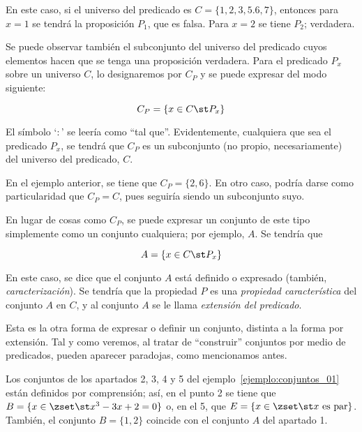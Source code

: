 
En este caso, si el universo del predicado es $C = \{1, 2, 3, 5. 6, 7\}$,
entonces para $x = 1$ se tendrá la proposición $P_1$, que es falsa. Para $x
= 2$ se tiene $P_2$; verdadera.

Se puede observar también el subconjunto del universo del predicado cuyos
elementos hacen que se tenga una proposición verdadera. Para el predicado
$P_x$ sobre un universo $C$, lo designaremos por $C_P$ y se puede expresar
del modo siguiente:

$$ C_P = \{x \in C \st P_x\} $$

\noindent El símbolo `$:$' se leería como ``tal que''. Evidentemente,
cualquiera que sea el predicado $P_x$, se tendrá que $C_P$ es un subconjunto
(no propio, necesariamente) del universo del predicado, $C$.

En el ejemplo anterior, se tiene que $C_P = \{2, 6\}$. En otro caso, podría
darse como particularidad que $C_P = C$, pues seguiría siendo un subconjunto
suyo.

En lugar de cosas como $C_P$, se puede expresar un conjunto de este tipo
simplemente como un conjunto cualquiera; por ejemplo, $A$. Se tendría que

$$ A = \{x \in C \st P_x\} $$

\noindent En este caso, se dice que el conjunto $A$ está definido o
expresado  (también,
\emph{caracterización}\footnotemark). Se tendría que la propiedad $P$ es una
\emph{propiedad característica} del conjunto $A$ en $C$, y al conjunto $A$
se le llama \emph{extensión del predicado}.


Esta es la otra forma de expresar o definir un conjunto, distinta a la forma
por extensión. Tal y como veremos, al tratar de ``construir'' conjuntos por
medio de predicados, pueden aparecer paradojas, como mencionamos antes.

Los conjuntos de los apartados 2, 3, 4 y 5 del
ejemplo~\ref{ejemplo:conjuntos_01} están definidos por comprensión; así, en
el punto 2 se tiene que $B = \{x \in \zset \st x^3 - 3x + 2 = 0\}$ o, en el
5, que $E = \{x \in \zset \st x \ \text{es par}\}$. También, el conjunto $B
= \{1, 2\}$ coincide con el conjunto $A$ del apartado 1.

